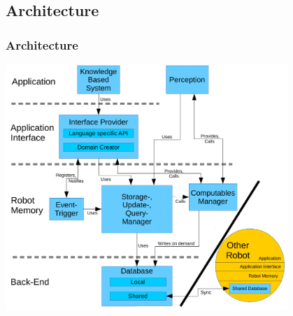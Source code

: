\subsection{Architecture}
\begin{frame}
  \frametitle{Architecture}
  \center
  \includegraphics[width=0.8\textwidth]{../architecture.pdf}
\end{frame}

